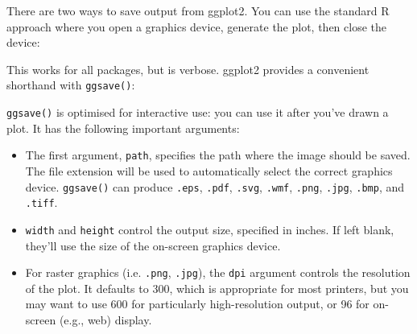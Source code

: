 There are two ways to save output from ggplot2. You can use the standard
R approach where you open a graphics device, generate the plot, then
close the device: 

\begin{Shaded}
\begin{Highlighting}[]
\NormalTok{(}\NormalTok{, } \NormalTok{, } \NormalTok{)}
\StringTok{ }\NormalTok{()}
\NormalTok{()}
\end{Highlighting}
\end{Shaded}

This works for all packages, but is verbose. ggplot2 provides a
convenient shorthand with \texttt{ggsave()}:

\begin{Shaded}
\begin{Highlighting}[]
\StringTok{ }\NormalTok{()}
\NormalTok{(}\NormalTok{)}
\end{Highlighting}
\end{Shaded}

\texttt{ggsave()} is optimised for interactive use: you can use it after
you've drawn a plot. It has the following important arguments:

\begin{itemize}
\item
  The first argument, \texttt{path}, specifies the path where the image
  should be saved. The file extension will be used to automatically
  select the correct graphics device. \texttt{ggsave()} can produce
  \texttt{.eps}, \texttt{.pdf}, \texttt{.svg}, \texttt{.wmf},
  \texttt{.png}, \texttt{.jpg}, \texttt{.bmp}, and \texttt{.tiff}.
\item
  \texttt{width} and \texttt{height} control the output size, specified
  in inches. If left blank, they'll use the size of the on-screen
  graphics device.
\item
  For raster graphics (i.e. \texttt{.png}, \texttt{.jpg}), the
  \texttt{dpi} argument controls the resolution of the plot. It defaults
  to 300, which is appropriate for most printers, but you may want to
  use 600 for particularly high-resolution output, or 96 for on-screen
  (e.g., web) display.
\end{itemize}

